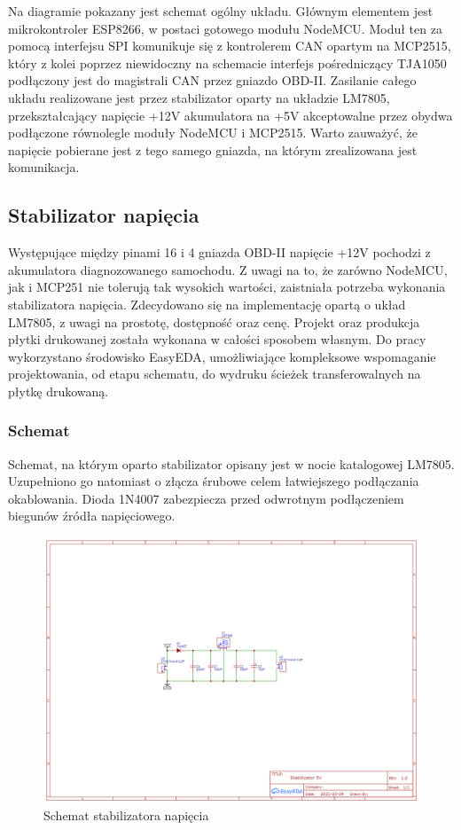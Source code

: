 \documentclass[10pt,a4paper]{scrartcl}
\begin{document}
	Na diagramie pokazany jest schemat ogólny układu. Głównym elementem jest mikrokontroler ESP8266, w postaci gotowego modułu NodeMCU. Moduł ten za pomocą interfejsu SPI komunikuje się z kontrolerem CAN opartym na MCP2515, który z kolei poprzez niewidoczny na schemacie interfejs pośredniczący TJA1050 podłączony jest do magistrali CAN przez gniazdo OBD-II. Zasilanie całego układu realizowane jest przez stabilizator oparty na układzie LM7805, przekształcający napięcie +12V akumulatora na +5V akceptowalne przez obydwa podłączone równolegle moduły NodeMCU i MCP2515. Warto zauważyć, że napięcie pobierane jest z tego samego gniazda, na którym zrealizowana jest komunikacja.
		\subsection{Stabilizator napięcia}
		Występujące między pinami 16 i 4 gniazda OBD-II napięcie +12V pochodzi z akumulatora diagnozowanego samochodu. Z uwagi na to, że zarówno NodeMCU, jak i MCP251 nie tolerują tak wysokich wartości, zaistniała potrzeba wykonania stabilizatora napięcia. Zdecydowano się na implementację opartą o układ LM7805, z uwagi na prostotę, dostępność oraz cenę. Projekt oraz produkcja płytki drukowanej została wykonana w całości sposobem własnym. Do pracy wykorzystano środowisko EasyEDA, umożliwiające kompleksowe wspomaganie projektowania, od etapu schematu, do wydruku ścieżek transferowalnych na płytkę drukowaną.
		\subsubsection{Schemat}
		Schemat, na którym oparto stabilizator opisany jest w nocie katalogowej LM7805. Uzupełniono go natomiast o złącza śrubowe celem łatwiejszego podłączania okablowania. Dioda 1N4007 zabezpiecza przed odwrotnym podłączeniem biegunów źródła napięciowego.
		\begin{figure}
			\centering
			\includegraphics[width=1.0\linewidth]{schemat_stabilizator}
			\caption{Schemat stabilizatora napięcia}
			\label{fig:schematstabilizator}
		\end{figure}\\
\end{document}
